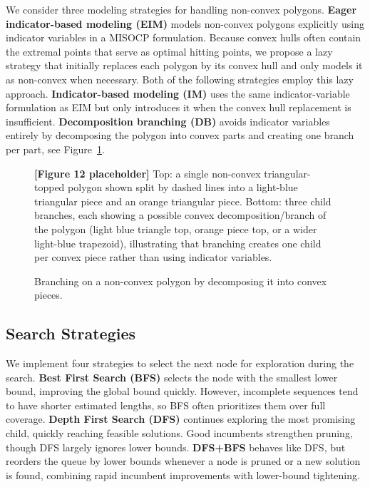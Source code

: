\documentclass[11pt,a4paper]{article}
\theoremstyle{plain}
\begin{document}
We consider three modeling strategies for handling non-convex polygons. \textbf{Eager indicator-based modeling (EIM)} models non-convex polygons explicitly using indicator variables in a MISOCP formulation. Because convex hulls often contain the extremal points that serve as optimal hitting points, we propose a lazy strategy that initially replaces each polygon by its convex hull and only models it as non-convex when necessary. Both of the following strategies employ this lazy approach. \textbf{Indicator-based modeling (IM)} uses the same indicator-variable formulation as EIM but only introduces it when the convex hull replacement is insufficient. \textbf{Decomposition branching (DB)} avoids indicator variables entirely by decomposing the polygon into convex parts and creating one branch per part, see Figure~\ref{fig:12}.

\begin{figure}[h]
\centering
\begin{figplaceholder}
\textbf{[Figure 12 placeholder]} Top: a single non-convex triangular-topped polygon shown split by dashed lines into a light-blue triangular piece and an orange triangular piece. Bottom: three child branches, each showing a possible convex decomposition/branch of the polygon (light blue triangle top, orange piece top, or a wider light-blue trapezoid), illustrating that branching creates one child per convex piece rather than using indicator variables.
\end{figplaceholder}
\caption{Branching on a non-convex polygon by decomposing it into convex pieces.}
\label{fig:12}
\end{figure}

\subsection{Search Strategies}
\label{sec:3.4}

We implement four strategies to select the next node for exploration during the search. \textbf{Best First Search (BFS)} selects the node with the smallest lower bound, improving the global bound quickly. However, incomplete sequences tend to have shorter estimated lengths, so BFS often prioritizes them over full coverage. \textbf{Depth First Search (DFS)} continues exploring the most promising child, quickly reaching feasible solutions. Good incumbents strengthen pruning, though DFS largely ignores lower bounds. \textbf{DFS+BFS} behaves like DFS, but reorders the queue by lower bounds whenever a node is pruned or a new solution is found, combining rapid incumbent improvements with lower-bound tightening.
\end{document}
